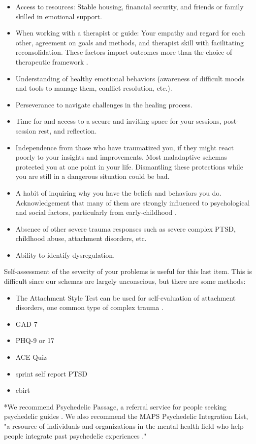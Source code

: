 \documentclass[12pt,letterpaper]{article}
\begin{document}
\begin{itemize}
    \item Access to resources: Stable housing, financial security, and friends or family skilled in emotional support.
    \item When working with a therapist or guide: Your empathy and regard for each other, agreement on goals and methods, and therapist skill with facilitating reconsolidation. These factors impact outcomes more than the choice of therapeutic framework \cite{wampoldCommonFactors}.
    \item Understanding of healthy emotional behaviors (awareness of difficult moods and tools to manage them, conflict resolution, etc.). 
    \item Perseverance to navigate challenges in the healing process.
    \item Time for and access to a secure and inviting space for your sessions, post-session rest, and reflection.
    \item Independence from those who have traumatized you, if they might react poorly to your insights and improvements. Most maladaptive schemas protected you at one point in your life. Dismantling these protections while you are still in a dangerous situation could be bad.
    \item A habit of inquiring why you have the beliefs and behaviors you do. Acknowledgement that many of them are strongly influenced to psychological and social factors, particularly from early-childhood \cite{brownAttachmentDisturbances}. 
    \item Absence of other severe trauma responses such as severe complex PTSD, childhood abuse, attachment disorders, etc.
    \item Ability to identify dysregulation.
\end{itemize}
Self-assessment of the severity of your problems is useful for this last item. This is difficult since our schemas are largely unconscious, but there are some methods:
\begin{itemize}
    \item The Attachment Style Test can be used for self-evaluation of attachment disorders, one common type of complex trauma \cite{attachmentProject}.
    \item GAD-7
    \item PHQ-9 or 17
    \item ACE Quiz
    \item sprint self report PTSD
    \item cbirt
\end{itemize}
*We recommend Psychedelic Passage, a referral service for people seeking psychedelic guides \cite{psychedelicPassage}. We also recommend the MAPS Psychedelic Integration List, "a resource of individuals and organizations in the mental health field who help people integrate past psychedelic experiences \cite{mapsIntegrationList}."
\end{document}
